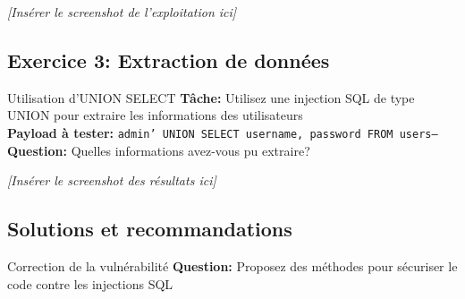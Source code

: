 \documentclass[12pt,a4paper]{article}
\begin{document}
\begin{answerbox}
\vspace{7cm}
\end{answerbox}

\begin{screenshotbox}
\centering
\textit{[Insérer le screenshot de l'exploitation ici]}
\end{screenshotbox}

\subsection{Exercice 3: Extraction de données}

\begin{exercicebox}{Utilisation d'UNION SELECT}
\textbf{Tâche:} Utilisez une injection SQL de type UNION pour extraire les informations des utilisateurs\\
\textbf{Payload à tester:} \texttt{admin' UNION SELECT username, password FROM users--}\\
\textbf{Question:} Quelles informations avez-vous pu extraire?
\end{exercicebox}

\begin{answerbox}
\vspace{7cm}
\end{answerbox}

\begin{screenshotbox}
\centering
\textit{[Insérer le screenshot des résultats ici]}
\end{screenshotbox}

\subsection{Solutions et recommandations}

\begin{exercicebox}{Correction de la vulnérabilité}
\textbf{Question:} Proposez des méthodes pour sécuriser le code contre les injections SQL
\end{exercicebox}

\begin{answerbox}
\vspace{7cm}
\end{answerbox}

\newpage
\end{document}
